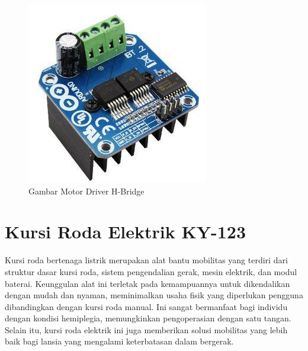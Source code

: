 \begin{figure}[H]
  \centering

  \includegraphics[scale=0.3]{gambar/Motor Driver H - bridge Bts.jpg}

  \caption{Gambar Motor Driver H-Bridge}
  \label{fig:roketluarangkasa}
\end{figure}

\section{Kursi Roda Elektrik KY-123}

Kursi roda bertenaga listrik merupakan alat bantu mobilitas yang terdiri dari struktur dasar kursi roda, sistem pengendalian gerak, mesin elektrik, dan modul baterai. Keunggulan alat ini terletak pada kemampuannya untuk dikendalikan dengan mudah dan nyaman, meminimalkan usaha fisik yang diperlukan pengguna dibandingkan dengan kursi roda manual. Ini sangat bermanfaat bagi individu dengan kondisi hemiplegia, memungkinkan pengoperasian dengan satu tangan. Selain itu, kursi roda elektrik ini juga memberikan solusi mobilitas yang lebih baik bagi lansia yang mengalami keterbatasan dalam bergerak.

